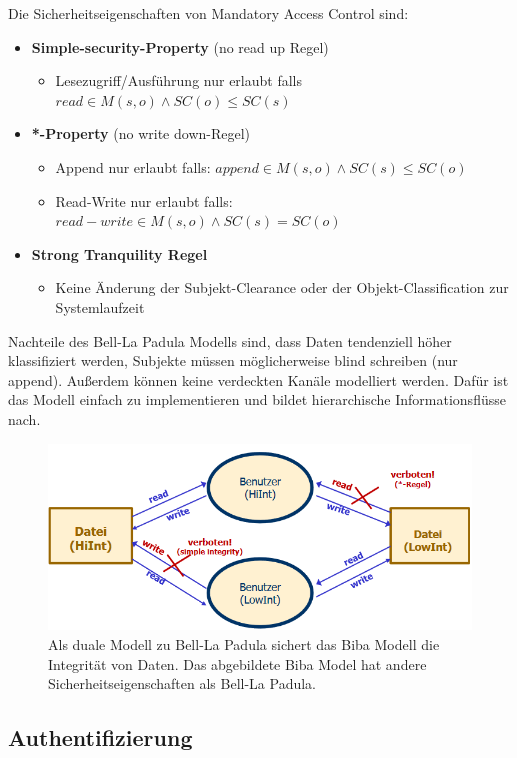 \documentclass[a4paper,12pt,leqno]{article}
\begin{document}
Die Sicherheitseigenschaften von Mandatory Access Control sind:
\begin{itemize}
\item \textbf{Simple-security-Property} (no read up Regel)
	\begin{itemize}
	\item Lesezugriff/Ausführung nur erlaubt falls $read\in M(s,o)\wedge SC(o)\leq SC(s)$
	\end{itemize}
\item \textbf{*-Property} (no write down-Regel)
	\begin{itemize}
	\item Append nur erlaubt falls: $append\in M(s,o)\wedge SC(s)\leq SC(o)$
	\item Read-Write nur erlaubt falls: $read-write \in M(s,o)\wedge SC(s)=SC(o)$
	\end{itemize}
\item \textbf{Strong Tranquility Regel}
	\begin{itemize}
	\item Keine Änderung der Subjekt-Clearance oder der Objekt-Classification zur Systemlaufzeit
	\end{itemize}
\end{itemize}
Nachteile des Bell-La Padula Modells sind, dass Daten tendenziell höher klassifiziert werden, Subjekte müssen möglicherweise blind schreiben (nur append). Außerdem können keine verdeckten Kanäle modelliert werden.
Dafür ist das Modell einfach zu implementieren und bildet hierarchische Informationsflüsse nach.
\begin{figure}
\centering
\includegraphics[scale=0.8]{Grafiken/BibaModell-MAC.png}
\caption{Als duale Modell zu Bell-La Padula sichert das Biba Modell die Integrität von Daten. Das abgebildete Biba Model hat andere Sicherheitseigenschaften als Bell-La Padula.}
\end{figure}
\subsection{Authentifizierung}
\end{document}
